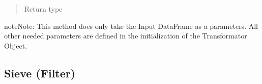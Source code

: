 \documentclass[a4paper,10pt, twoside,english]{sphinxmanual}
\begin{document}
\begin{fulllineitems}
\begin{fulllineitems}
\begin{quote}
\begin{description}
\item[{Return type}] \leavevmode
{}

\end{description}\end{quote}

\begin{sphinxadmonition}{note}{Note:}
This method does only take the Input DataFrame as a parameters. All other needed parameters
are defined in the initialization of the Transformator Object.
\end{sphinxadmonition}

\end{fulllineitems}


\end{fulllineitems}



\subsection{Sieve (Filter)}
\label{\detokenize{transformer/sieve:module-spooq2.transformer.sieve}}\label{\detokenize{transformer/sieve:sieve-filter}}\label{\detokenize{transformer/sieve::doc}}
\end{document}
